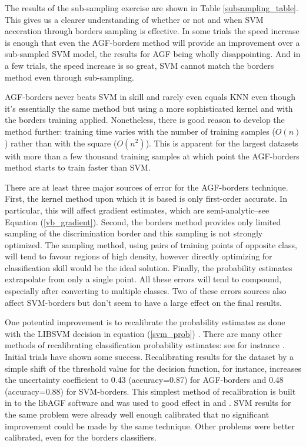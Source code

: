 The results of the sub-sampling exercise are shown in Table \ref{subsampling_table}.
This gives us a clearer understanding of whether or not and
when SVM acceration through borders sampling is effective.
In some trials the speed increase is enough that even the AGF-borders method will provide an
improvement over a sub-sampled SVM model, the results for AGF being wholly
disappointing.
And in a few trials, the speed increase is so great, SVM cannot match the borders
method even through sub-sampling.

AGF-borders never beats SVM in skill and
rarely even equals KNN even though it's essentially the same method
but using a more sophisticated kernel and with the borders training applied.
Nonetheless, there is good reason to develop the method further: 
training time varies with the number of training samples ($O(n)$) rather than with
the square ($O(n^2)$).
This is apparent for the largest datasets with more than a few thousand training samples
at which point the AGF-borders method starts to train faster than SVM.

There are at least three major sources of error for the AGF-borders technique.
First, the kernel method upon which it is based is only first-order accurate.
In particular, this will affect gradient estimates, 
which are semi-analytic--see Equation (\ref{vb_gradient}).
Second, the borders method provides only limited sampling of the discrimination
border and this sampling is not strongly optimized.
The sampling method, using pairs of training points of opposite class, will
tend to favour regions of high density, however  
directly optimizing for classification skill would be the ideal solution.
Finally, the probability estimates extrapolate from only a single point.
All these errors will tend to compound, especially after converting to
multiple classes.
Two of these errors sources also affect SVM-borders but don't seem to have a large
effect on the final results.

One potential improvement is to recalibrate the probability estimates as 
done with the LIBSVM decision in equation (\ref{svm_prob}) \citep{Platt1999, Lin_etal2007}.
There are many other methods of recalibrating classification probability
estimates: see for instance 
\citet{Niculescu-Mizil_Caruana2005, Zadrozny_Elkan2001}.
Initial trials have shown some success.
Recalibrating results for the  dataset by a simple shift of the threshold value
for the decision function, for instance, increases the
uncertainty coefficient to 0.43 (accuracy=0.87) for AGF-borders and 0.48 (accuracy=0.88)
for SVM-borders.
This simplest method of recalibration is built in to the libAGF software
and was used to good effect in \citet{Mills2009} and \citet{Mills2011}.
SVM results for the same problem were already well enough calibrated
that no significant improvement could be made by the same technique.
Other problems were better calibrated, even for the borders classifiers.

